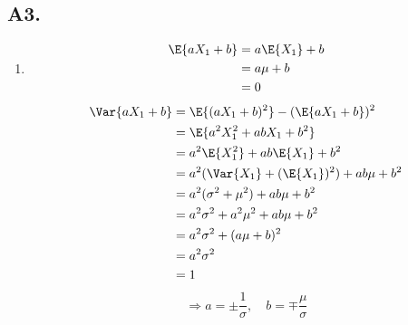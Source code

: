 \documentclass[fleqn]{article}
\begin{document}

\subsection*{A3.}

\begin{enumerate}[label=(\alph*)]
\item
\begin{align*}
\E{aX_1+b} &= a\E{X_1} + b \\
           &= a\mu + b \\
           &= 0
\end{align*}
\begin{align*}
\Var{aX_1+b} &= \E{(aX_1+b)^2} - (\E{aX_1+b})^2 \\
             &= \E{a^2X_1^2 + abX_1 + b^2} \\
             &= a^2\E{X_1^2} + ab\E{X_1} + b^2 \\
             &= a^2(\Var{X_1}+(\E{X_1})^2) + ab\mu + b^2 \\
             &= a^2(\sigma^2 + \mu^2) + ab\mu + b^2 \\
             &= a^2\sigma^2 + a^2\mu^2 + ab\mu + b^2 \\
             &= a^2\sigma^2 + (a\mu + b)^2 \\
             &= a^2\sigma^2 \\
             &= 1
\end{align*}
\[
\Rightarrow a = \pm \frac{1}{\sigma}, \quad b = \mp \frac{\mu}{\sigma}
\]


\end{enumerate}
\end{document}
